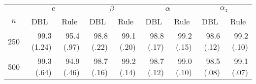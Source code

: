 \documentclass{article}
\begin{document}
\begin{tabular}{lrrrrrrrr}
   \hline
 
       &  \multicolumn{2}{c}{$e$}    & \multicolumn{2}{c}{$\beta$}  & \multicolumn{2}{c}{$\alpha$}  & \multicolumn{2}{c}{$\alpha_z$} \\ 
          \cmidrule(l{2pt}r{2pt}){2-3} \cmidrule(l{2pt}r{2pt}){4-5} \cmidrule(l{2pt}r{2pt}){6-7} \cmidrule(l{2pt}r{2pt}){8-9} 
         \multicolumn{1}{c}{$n$} & \multicolumn{1}{c}{DBL}& \multicolumn{1}{c}{Rule}& \multicolumn{1}{c}{DBL}& \multicolumn{1}{c}{Rule}& \multicolumn{1}{c}{DBL}& \multicolumn{1}{c}{Rule}& \multicolumn{1}{c}{DBL}& \multicolumn{1}{c}{Rule} \\ \hline
    250 & 99.3 (1.24) & 95.4 (.97) & 98.8 (.22) & 99.1 (.20) & 98.8 (.17) & 99.2 (.15) & 98.6 (.12) & 99.2 (.10) \\ 
  500 & 99.3 (.64) & 94.9 (.46) & 98.7 (.16) & 99.2 (.14) & 98.7 (.12) & 99.0 (.10) & 98.5 (.08) & 99.1 (.07) \\ 
   \hline
\end{tabular}
\end{document}
